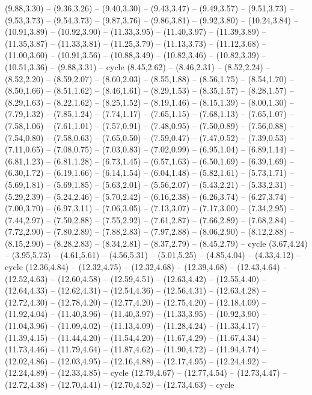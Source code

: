 \expandafter\def\csname geo:gebiet:TN\endcsname{
  (9.88,3.30) -- (9.36,3.26) -- (9.40,3.30) -- (9.43,3.47) -- (9.49,3.57) -- (9.51,3.73) -- (9.53,3.73) -- (9.54,3.73) -- (9.87,3.76) -- (9.86,3.81) -- (9.92,3.80) -- (10.24,3.84) -- (10.91,3.89) -- (10.92,3.90) -- (11.33,3.95) -- (11.40,3.97) -- (11.39,3.89) -- (11.35,3.87) -- (11.33,3.81) -- (11.25,3.79) -- (11.13,3.73) -- (11.12,3.68) -- (11.00,3.60) -- (10.91,3.56) -- (10.88,3.49) -- (10.82,3.46) -- (10.82,3.39) -- (10.51,3.36) -- (9.88,3.31) -- cycle}
\expandafter\def\csname geo:gebiet:TX\endcsname{
  (8.45,2.62) -- (8.46,2.31) -- (8.52,2.24) -- (8.52,2.20) -- (8.59,2.07) -- (8.60,2.03) -- (8.55,1.88) -- (8.56,1.75) -- (8.54,1.70) -- (8.50,1.66) -- (8.51,1.62) -- (8.46,1.61) -- (8.29,1.53) -- (8.35,1.57) -- (8.28,1.57) -- (8.29,1.63) -- (8.22,1.62) -- (8.25,1.52) -- (8.19,1.46) -- (8.15,1.39) -- (8.00,1.30) -- (7.79,1.32) -- (7.85,1.24) -- (7.74,1.17) -- (7.65,1.15) -- (7.68,1.13) -- (7.65,1.07) -- (7.58,1.06) -- (7.61,1.01) -- (7.57,0.91) -- (7.48,0.95) -- (7.50,0.89) -- (7.56,0.88) -- (7.54,0.80) -- (7.58,0.63) -- (7.65,0.50) -- (7.59,0.47) -- (7.47,0.52) -- (7.39,0.53) -- (7.11,0.65) -- (7.08,0.75) -- (7.03,0.83) -- (7.02,0.99) -- (6.95,1.04) -- (6.89,1.14) -- (6.81,1.23) -- (6.81,1.28) -- (6.73,1.45) -- (6.57,1.63) -- (6.50,1.69) -- (6.39,1.69) -- (6.30,1.72) -- (6.19,1.66) -- (6.14,1.54) -- (6.04,1.48) -- (5.82,1.61) -- (5.73,1.71) -- (5.69,1.81) -- (5.69,1.85) -- (5.63,2.01) -- (5.56,2.07) -- (5.43,2.21) -- (5.33,2.31) -- (5.29,2.39) -- (5.24,2.46) -- (5.70,2.42) -- (6.16,2.38) -- (6.26,3.74) -- (6.27,3.74) -- (7.00,3.70) -- (6.97,3.11) -- (7.06,3.05) -- (7.13,3.07) -- (7.17,3.00) -- (7.34,2.95) -- (7.44,2.97) -- (7.50,2.88) -- (7.55,2.92) -- (7.61,2.87) -- (7.66,2.89) -- (7.68,2.84) -- (7.72,2.90) -- (7.80,2.89) -- (7.88,2.83) -- (7.97,2.88) -- (8.06,2.90) -- (8.12,2.88) -- (8.15,2.90) -- (8.28,2.83) -- (8.34,2.81) -- (8.37,2.79) -- (8.45,2.79) -- cycle}
\expandafter\def\csname geo:gebiet:UT\endcsname{
  (3.67,4.24) -- (3.95,5.73) -- (4.61,5.61) -- (4.56,5.31) -- (5.01,5.25) -- (4.85,4.04) -- (4.33,4.12) -- cycle}
\expandafter\def\csname geo:gebiet:VA\endcsname{
  (12.36,4.84) -- (12.32,4.75) -- (12.32,4.68) -- (12.39,4.68) -- (12.43,4.64) -- (12.52,4.63) -- (12.60,4.58) -- (12.59,4.51) -- (12.63,4.42) -- (12.55,4.40) -- (12.64,4.33) -- (12.62,4.31) -- (12.54,4.36) -- (12.56,4.31) -- (12.63,4.28) -- (12.72,4.30) -- (12.78,4.20) -- (12.77,4.20) -- (12.75,4.20) -- (12.18,4.09) -- (11.92,4.04) -- (11.40,3.96) -- (11.40,3.97) -- (11.33,3.95) -- (10.92,3.90) -- (11.04,3.96) -- (11.09,4.02) -- (11.13,4.09) -- (11.28,4.24) -- (11.33,4.17) -- (11.39,4.15) -- (11.44,4.20) -- (11.54,4.20) -- (11.67,4.29) -- (11.67,4.34) -- (11.73,4.46) -- (11.79,4.64) -- (11.87,4.62) -- (11.90,4.72) -- (11.94,4.74) -- (12.02,4.86) -- (12.03,4.95) -- (12.16,4.88) -- (12.17,4.95) -- (12.24,4.92) -- (12.24,4.89) -- (12.33,4.85) -- cycle
  (12.79,4.67) -- (12.77,4.54) -- (12.73,4.47) -- (12.72,4.38) -- (12.70,4.41) -- (12.70,4.52) -- (12.73,4.63) -- cycle}
